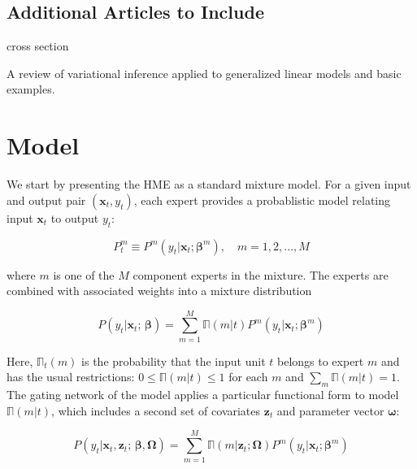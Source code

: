 \documentclass[12pt]{article}
\newcommand{\expmixwt}[0]{\mathbb{\Pi}}
\begin{document}
\subsection{Additional Articles to Include}

\cite{JeffriesPfeiffer2001} cross section

\cite{BleiKucukelbirMcAuliffe2006} A review of variational inference applied
to generalized linear models and basic examples.

\cite{CarvalhoSkoulakis2005}

\bigskip


\section{Model} \label{sec:Model}

We start by presenting the HME as a standard mixture model.
For a given input and output pair $(\boldsymbol{x}_{t}, y_{t})$, each expert
provides a probablistic model relating input $\boldsymbol{x}_{t}$ to output
$y_{t}$:

\begin{equation} \label{eq:ConditionalDistribution}
  P^{m}_{t} \equiv P^{m}(y_{t}|\boldsymbol{x}_{t}; \boldsymbol{\beta}^{m}), \quad m = 1,2,...,M
\end{equation}

where $m$ is one of the $M$ component experts in the mixture. The experts
are combined with associated weights into a mixture distribution

\begin{equation} \label{eq:staticmixture}
  P(y_{t} | \boldsymbol{x}_{t}; \, \boldsymbol{\beta}) = \sum_{m=1}^{M} \expmixwt(m|t) P^{m}(y_{t} | \boldsymbol{x}_{t}; \boldsymbol{\beta}^{m})
\end{equation}

Here, $\expmixwt_{t}(m)$ is the probability that the input unit $t$ belongs
to expert $m$ and has the usual restrictions: $0 \leq \expmixwt(m|t) \leq 1$
for each $m$ and $\sum_{m} \expmixwt(m|t) = 1$. The gating network of the model
applies a particular functional form to model $\expmixwt(m|t)$, which includes a
second set of covariates $\boldsymbol{z}_{t}$ and parameter vector $\boldsymbol{\omega}$:

\begin{equation} \label{eq:mixture}
  P(y_{t} | \boldsymbol{x}_{t}, \boldsymbol{z}_{t}; \, \boldsymbol{\beta}, \boldsymbol{\Omega}) = \sum_{m=1}^{M} \expmixwt(m | \boldsymbol{z}_{t}; \boldsymbol{\Omega}) P^{m}(y_{t} | \boldsymbol{x}_{t}; \boldsymbol{\beta}^{m})
\end{equation}
\end{document}
